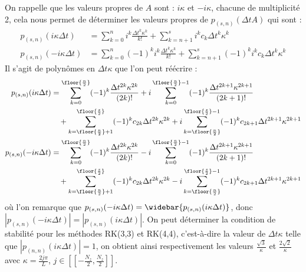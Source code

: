 On rappelle que les valeurs propres de $A$ sont : $i\kappa$ et $-i\kappa$, chacune de multiplicité 2, cela nous permet de déterminer les valeurs propres de $p_{(s,n)}(\Delta t A)$ qui sont :
$$
  \begin{aligned}
    p_{(s,n)}( i\kappa\Delta t) &= \sum_{k=0}^n       i^k\frac{\Delta t^k\kappa^k}{k!} + \sum_{k=n+1}^s       i^kc_k\Delta t^k\kappa^k \\
    p_{(s,n)}(-i\kappa\Delta t) &= \sum_{k=0}^n (-1)^ki^k\frac{\Delta t^k\kappa^k}{k!} + \sum_{k=n+1}^s (-1)^ki^kc_k\Delta t^k\kappa^k
  \end{aligned}
$$
Il s'agit de polynômes en $\Delta t\kappa$ que l'on peut réécrire :
$$
  \begin{aligned}
    p_{(s,n)}( i\kappa\Delta t) &=  \sum_{k=0}^{ \floor{\frac{n}{2}}   }(-1)^k\frac{\Delta t^{2k}\kappa^{2k}}{(2k)!}
                                 + i\sum_{k=0}^{ \floor{\frac{n}{2}}-1 }(-1)^k\frac{\Delta t^{2k+1}\kappa^{2k+1}}{(2k+1)!}\\
                                 &\quad+  \sum_{k=\floor{\frac{n}{2}}+1}^{ \floor{\frac{s}{2}}   } (-1)^k c_{2k}\Delta t^{2k}\kappa^{2k}
                                       + i\sum_{k=\floor{\frac{n}{2}}  }^{ \floor{\frac{s}{2}}-1 } (-1)^k c_{2k+1}\Delta t^{2k+1}\kappa^{2k+1} \\
    p_{(s,n)}(-i\kappa\Delta t) &=  \sum_{k=0}^{ \floor{\frac{n}{2}}   }(-1)^k\frac{\Delta t^{2k}\kappa^{2k}}{(2k)!}
                                 - i\sum_{k=0}^{ \floor{\frac{n}{2}}-1 }(-1)^k\frac{\Delta t^{2k+1}\kappa^{2k+1}}{(2k+1)!}\\
                                 &\quad+  \sum_{k=\floor{\frac{n}{2}}+1}^{ \floor{\frac{s}{2}}   } (-1)^k c_{2k}\Delta t^{2k}\kappa^{2k}
                                       - i\sum_{k=\floor{\frac{n}{2}}  }^{ \floor{\frac{s}{2}}-1 } (-1)^k c_{2k+1}\Delta t^{2k+1}\kappa^{2k+1} \\
  \end{aligned}
$$
où l'on remarque que $p_{(s,n)}(-i\kappa\Delta t) = \widebar{p_{(s,n)}(i\kappa\Delta t)}$, donc $\left|p_{(s,n)}(-i\kappa\Delta t)\right|=\left|p_{(s,n)}(i\kappa\Delta t)\right|$. On peut déterminer la condition de stabilité pour les méthodes RK(3,3) et RK(4,4), c'est-à-dire la valeur de $\Delta t\kappa$ telle que $|p_{(n,n)}(i\kappa\Delta t)|=1$, on obtient ainsi respectivement les valeurs $\frac{\sqrt{3}}{\kappa}$ et $\frac{2\sqrt{2}}{\kappa}$ avec $\kappa = \frac{2j\pi}{L}$, $j\in[\![-\frac{N_z}{2},\frac{N_z}{2}]\!]$.


